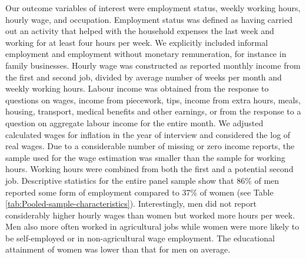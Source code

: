 \documentclass[12pt,english]{article}
\begin{document}
Our outcome variables of interest were employment status, weekly working hours, hourly wage, and occupation. Employment status was defined as having carried out an activity that helped with the household expenses the last week and working for at least four hours per week. We explicitly included informal employment and employment without monetary remuneration, for instance in family businesses.  Hourly wage was constructed as reported monthly income from the first and second job, divided by average number of weeks per month and weekly working hours.  Labour income was obtained from the response to questions on wages, income from piecework, tips, income from extra hours, meals, housing, transport, medical benefits and other earnings, or from the response to a question on aggregate labour income for the entire month. We adjusted calculated wages for inflation in the year of interview and considered the log of real wages. Due to a considerable number of missing or zero income reports, the sample used for the wage estimation was smaller than the sample for working hours. Working hours were combined from both the first and a potential second job. Descriptive statistics for the entire panel sample show that 86\% of men reported some form of employment compared to 37\% of women (see Table \ref{tab:Pooled-sample-characteristics}). Interestingly, men did not report considerably higher hourly wages than women but worked more hours per week. Men also more often worked in agricultural jobs while women were more likely to be self-employed or in non-agricultural wage employment. The educational attainment of women was lower than that for men on average.
\end{document}
